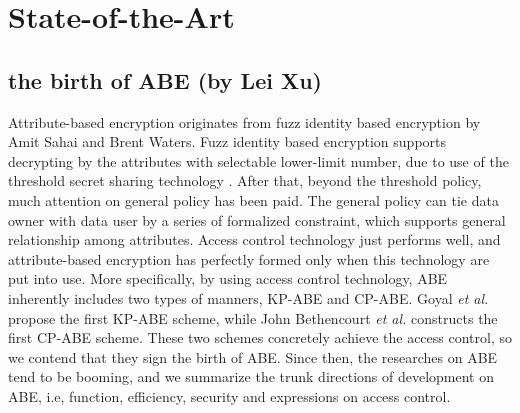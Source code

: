 \section{State-of-the-Art}
\subsection{the birth of ABE (by Lei Xu)}
Attribute-based encryption originates from fuzz identity based encryption \cite{Sahai:EUROCRYPT'05} by Amit Sahai and Brent Waters. %
Fuzz identity based encryption supports decrypting by the attributes with selectable lower-limit number,
due to use of the threshold secret sharing technology \cite{Shamir:CACM'79}.
After that, beyond the threshold policy, much attention on general policy has been paid.
The general policy can tie data owner with data user by a series of formalized constraint,
which supports general relationship among attributes.
Access control technology just performs well,
and attribute-based encryption has perfectly formed only when this technology are put into use.
More specifically, by using access control technology, ABE inherently includes two types of manners, KP-ABE and CP-ABE.
Goyal \emph{et al.} \cite{Goyal:CCS'06} propose the first KP-ABE scheme,
while John Bethencourt \emph{et al.} \cite{Bethencourt:SP'07} constructs the first CP-ABE scheme.
These two schemes concretely achieve the access control,
so we contend that they sign the birth of ABE.
Since then, the researches on ABE tend to be booming,
and we summarize the trunk directions of development on ABE,
i.e, function, efficiency, security and expressions on access control.
